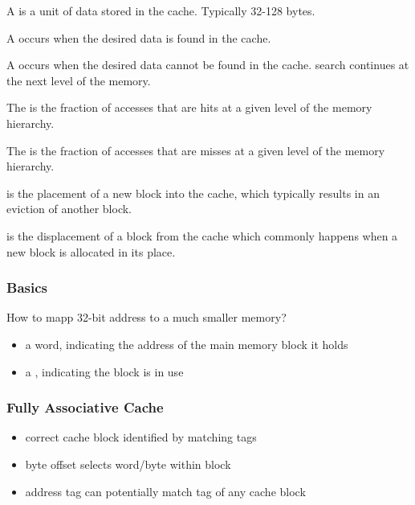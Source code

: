 \documentclass{article}
\begin{document}
\begin{definition}
	A  is a unit of data stored in the cache. Typically 32-128 bytes.
\end{definition}
\begin{definition}
	A  occurs when the desired data is found in the cache.
\end{definition}
\begin{definition}
	A  occurs when the desired data cannot be found in the cache.
	\Rightarrow search continues at the next level of the memory.
\end{definition}
\begin{definition}
	The  is the fraction of accesses that are hits at a given level of the memory hierarchy.
\end{definition}
\begin{definition}
	The  is the fraction of accesses that are misses at a given level of the memory hierarchy.
\end{definition}
\begin{definition}
	 is the placement of a new block into the cache, which typically results in an eviction
	of another block.
\end{definition}
\begin{definition}
	 is the displacement of a block from the cache which commonly happens when a new block is
	allocated in its place.
\end{definition}

\subsubsection{Basics}

How to mapp 32-bit address to a much smaller memory?
\begin{itemize}
	\item a  word, indicating the address of the main memory block it holds
	\item a , indicating the block is in use
\end{itemize}

\subsubsection{Fully Associative Cache}

\begin{itemize}
	\item correct cache block identified by matching tags
	\item byte offset selects word/byte within block
	\item address tag can potentially match tag of any cache block
\end{itemize}
\end{document}
